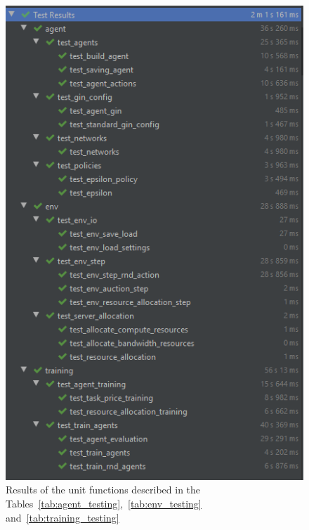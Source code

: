 \begin{figure}[h]
    \centering
    \includegraphics{figures/4_test_eval_figs/pytest_results.PNG}
    \caption{Results of the unit functions described in the Tables~\ref{tab:agent_testing},~\ref{tab:env_testing}
        and~\ref{tab:training_testing}}
    \label{fig:pytest_results}
\end{figure}

